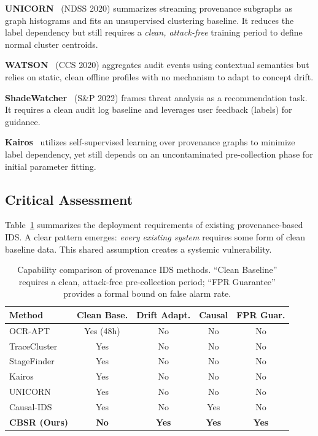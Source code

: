 \textbf{UNICORN}~\cite{han2020unicorn} (NDSS 2020) summarizes streaming provenance subgraphs as
graph histograms and fits an unsupervised clustering baseline. It reduces the label dependency but
still requires a \emph{clean, attack-free} training period to define normal cluster centroids.

\textbf{WATSON}~\cite{gao2020watson} (CCS 2020) aggregates audit events using contextual
semantics but relies on static, clean offline profiles with no mechanism to adapt to concept drift.

\textbf{ShadeWatcher}~\cite{yang2022shadewatcher} (S\&P 2022) frames threat analysis as a
recommendation task. It requires a clean audit log baseline and leverages user feedback (labels)
for guidance.

\textbf{Kairos}~\cite{cheng2024kairos} utilizes self-supervised learning over provenance graphs
to minimize label dependency, yet still depends on an uncontaminated pre-collection phase for
initial parameter fitting.

\subsection{Critical Assessment}

Table~\ref{tab:lit_requirements} summarizes the deployment requirements of existing
provenance-based IDS. A clear pattern emerges: \emph{every existing system} requires some form of
clean baseline data. This shared assumption creates a systemic vulnerability.

\begin{table}[htbp]
\centering
\small
\caption{Capability comparison of provenance IDS methods. ``Clean Baseline'' requires a clean,
attack-free pre-collection period; ``FPR Guarantee'' provides a formal bound on false alarm rate.}
\begin{tabularx}{\linewidth}{Xcccc}
\hline
\rowcolor[gray]{0.88}
\textbf{Method} & \textbf{Clean Base.} & \textbf{Drift Adapt.} & \textbf{Causal} & \textbf{FPR Guar.} \\
\hline
OCR-APT~\cite{ocrapt2025}       & Yes (48h) & No  & No  & No  \\
TraceCluster~\cite{tracecluster2026} & Yes  & No  & No  & No  \\
StageFinder~\cite{stagefinder2026}   & Yes  & No  & No  & No  \\
Kairos~\cite{cheng2024kairos}        & Yes  & No  & No  & No  \\
UNICORN~\cite{han2020unicorn}         & Yes  & No  & No  & No  \\
Causal-IDS~\cite{causalids2026}       & Yes  & No  & Yes & No  \\
\textbf{CBSR (Ours)}                  & \textbf{No} & \textbf{Yes} & \textbf{Yes} & \textbf{Yes} \\
\hline
\end{tabularx}
\label{tab:lit_requirements}
\end{table}


